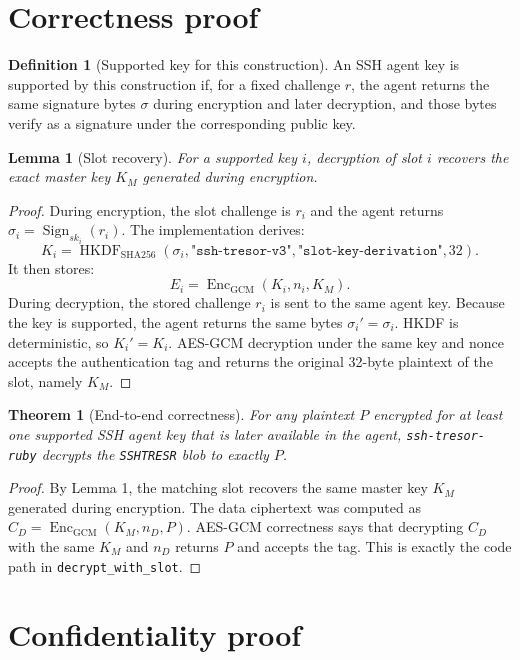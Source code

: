 \documentclass[11pt]{article}
\theoremstyle{definition}
\newtheorem{definition}{Definition}
\theoremstyle{plain}
\newtheorem{lemma}{Lemma}
\newtheorem{theorem}{Theorem}
\newcommand{\Project}{\texttt{ssh-tresor-ruby}}
\newcommand{\Tresor}{\texttt{SSHTRESR}}
\newcommand{\HKDF}{\operatorname{HKDF}}
\newcommand{\Enc}{\operatorname{Enc}}
\newcommand{\Sign}{\operatorname{Sign}}
\begin{document}
\section{Correctness proof}

\begin{definition}[Supported key for this construction]
An SSH agent key is supported by this construction if, for a fixed challenge $r$, the agent returns the same signature bytes $\sigma$ during encryption and later decryption, and those bytes verify as a signature under the corresponding public key.
\end{definition}

\begin{lemma}[Slot recovery]
For a supported key $i$, decryption of slot $i$ recovers the exact master key $K_M$ generated during encryption.
\end{lemma}

\begin{proof}
During encryption, the slot challenge is $r_i$ and the agent returns $\sigma_i=\Sign_{sk_i}(r_i)$. The implementation derives:
\[
K_i = \HKDF_{\mathrm{SHA256}}(\sigma_i,\texttt{"ssh-tresor-v3"},\texttt{"slot-key-derivation"},32).
\]
It then stores:
\[
E_i = \Enc_{\mathrm{GCM}}(K_i,n_i,K_M).
\]
During decryption, the stored challenge $r_i$ is sent to the same agent key. Because the key is supported, the agent returns the same bytes $\sigma_i'=\sigma_i$. HKDF is deterministic, so $K_i'=K_i$. AES-GCM decryption under the same key and nonce accepts the authentication tag and returns the original 32-byte plaintext of the slot, namely $K_M$.
\end{proof}

\begin{theorem}[End-to-end correctness]
For any plaintext $P$ encrypted for at least one supported SSH agent key that is later available in the agent, \Project{} decrypts the \Tresor{} blob to exactly $P$.
\end{theorem}

\begin{proof}
By Lemma 1, the matching slot recovers the same master key $K_M$ generated during encryption. The data ciphertext was computed as $C_D=\Enc_{\mathrm{GCM}}(K_M,n_D,P)$. AES-GCM correctness says that decrypting $C_D$ with the same $K_M$ and $n_D$ returns $P$ and accepts the tag. This is exactly the code path in \texttt{decrypt\_with\_slot}.
\end{proof}

\section{Confidentiality proof}
\end{document}
